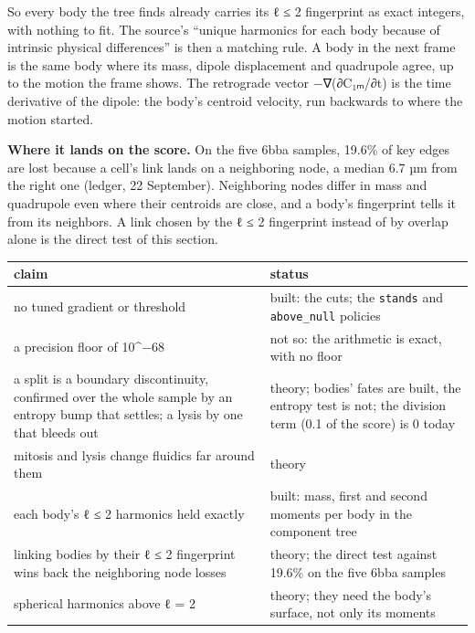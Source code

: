 So every body the tree finds already carries its ℓ ≤ 2 fingerprint as exact integers, with nothing to fit. The source's “unique harmonics for each body because of intrinsic physical differences” is then a matching rule. A body in the next frame is the same body where its mass, dipole displacement and quadrupole agree, up to the motion the frame shows. The retrograde vector −∇(∂C₁ₘ/∂t) is the time derivative of the dipole: the body's centroid velocity, run backwards to where the motion started.

\textbf{Where it lands on the score.} On the five 6bba samples, 19.6\% of key edges are lost because a cell's link lands on a neighboring node, a median 6.7 µm from the right one (ledger, 22 September). Neighboring nodes differ in mass and quadrupole even where their centroids are close, and a body's fingerprint tells it from its neighbors. A link chosen by the ℓ ≤ 2 fingerprint instead of by overlap alone is the direct test of this section.

{\small
\setlength{\tabcolsep}{6pt}
\begin{longtable}{>{\RaggedRight\arraybackslash}p{}>{\RaggedRight\arraybackslash}p{}}
\toprule
claim & status \\
\midrule
\endhead
no tuned gradient or threshold & built: the cuts; the \texttt{stands} and \texttt{above\_\allowbreak{}null} policies \\
a precision floor of 10\textasciicircum{}−68 & not so: the arithmetic is exact, with no floor \\
a split is a boundary discontinuity, confirmed over the whole sample by an entropy bump that settles; a lysis by one that bleeds out & theory; bodies' fates are built, the entropy test is not; the division term (0.1 of the score) is 0 today \\
mitosis and lysis change fluidics far around them & theory \\
each body's ℓ ≤ 2 harmonics held exactly & built: mass, first and second moments per body in the component tree \\
linking bodies by their ℓ ≤ 2 fingerprint wins back the neighboring node losses & theory; the direct test against 19.6\% on the five 6bba samples \\
spherical harmonics above ℓ = 2 & theory; they need the body's surface, not only its moments \\
\bottomrule
\end{longtable}
}

